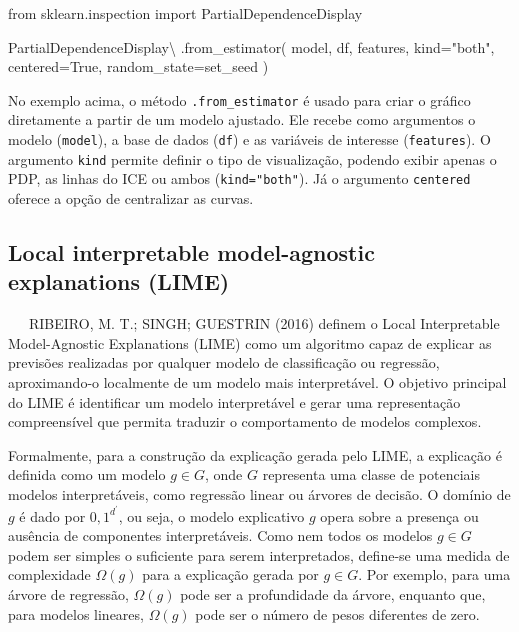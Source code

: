 \documentclass[
  12pt,
  a4paper,
]{scrreprt}
\newenvironment{Shaded}{}{}
\newcommand{\ImportTok}[1]{\textcolor[rgb]{0.01,0.18,0.38}{#1}}
\newcommand{\NormalTok}[1]{\textcolor[rgb]{0.14,0.16,0.18}{#1}}
\newcommand{\OperatorTok}[1]{\textcolor[rgb]{0.14,0.16,0.18}{#1}}
\newcommand{\StringTok}[1]{\textcolor[rgb]{0.01,0.18,0.38}{#1}}
\newcommand{\VariableTok}[1]{\textcolor[rgb]{0.89,0.38,0.04}{#1}}
\begin{document}
\begin{Shaded}
\begin{Highlighting}[]
\ImportTok{from}\NormalTok{ sklearn.inspection }\ImportTok{import}\NormalTok{ PartialDependenceDisplay}

\NormalTok{PartialDependenceDisplay}\OperatorTok{\textbackslash{}}
\NormalTok{    .from\_estimator(}
\NormalTok{        model,}
\NormalTok{        df,}
\NormalTok{        features,}
\NormalTok{        kind}\OperatorTok{=}\StringTok{"both"}\NormalTok{,}
\NormalTok{        centered}\OperatorTok{=}\VariableTok{True}\NormalTok{,}
\NormalTok{        random\_state}\OperatorTok{=}\NormalTok{set\_seed}
\NormalTok{    )}
\end{Highlighting}
\end{Shaded}

No exemplo acima, o método \texttt{.from\_estimator} é usado para criar
o gráfico diretamente a partir de um modelo ajustado. Ele recebe como
argumentos o modelo (\texttt{model}), a base de dados (\texttt{df}) e as
variáveis de interesse (\texttt{features}). O argumento \texttt{kind}
permite definir o tipo de visualização, podendo exibir apenas o PDP, as
linhas do ICE ou ambos (\texttt{kind="both"}). Já o argumento
\texttt{centered} oferece a opção de centralizar as curvas.

\subsection{Local interpretable model-agnostic explanations
(LIME)}\label{local-interpretable-model-agnostic-explanations-lime}

~~~RIBEIRO, M. T.; SINGH; GUESTRIN (2016) definem o Local Interpretable
Model-Agnostic Explanations (LIME) como um algoritmo capaz de explicar
as previsões realizadas por qualquer modelo de classificação ou
regressão, aproximando-o localmente de um modelo mais interpretável. O
objetivo principal do LIME é identificar um modelo interpretável e gerar
uma representação compreensível que permita traduzir o comportamento de
modelos complexos.

\vspace{12pt}

Formalmente, para a construção da explicação gerada pelo LIME, a
explicação é definida como um modelo \(g \in G\), onde \(G\) representa
uma classe de potenciais modelos interpretáveis, como regressão linear
ou árvores de decisão. O domínio de \(g\) é dado por \({0, 1}^{d^{'}}\),
ou seja, o modelo explicativo \(g\) opera sobre a presença ou ausência
de componentes interpretáveis. Como nem todos os modelos \(g \in G\)
podem ser simples o suficiente para serem interpretados, define-se uma
medida de complexidade \(\Omega\left(g\right)\) para a explicação gerada
por \(g \in G\). Por exemplo, para uma árvore de regressão,
\(\Omega\left(g\right)\) pode ser a profundidade da árvore, enquanto
que, para modelos lineares, \(\Omega\left(g\right)\) pode ser o número
de pesos diferentes de zero.
\end{document}

